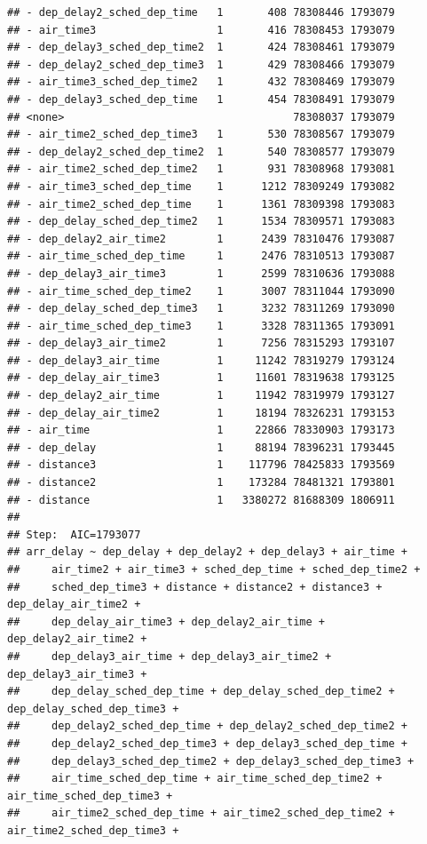 \documentclass[
]{article}
\begin{document}
\begin{verbatim}
## - dep_delay2_sched_dep_time   1       408 78308446 1793079
## - air_time3                   1       416 78308453 1793079
## - dep_delay3_sched_dep_time2  1       424 78308461 1793079
## - dep_delay2_sched_dep_time3  1       429 78308466 1793079
## - air_time3_sched_dep_time2   1       432 78308469 1793079
## - dep_delay3_sched_dep_time   1       454 78308491 1793079
## <none>                                    78308037 1793079
## - air_time2_sched_dep_time3   1       530 78308567 1793079
## - dep_delay2_sched_dep_time2  1       540 78308577 1793079
## - air_time2_sched_dep_time2   1       931 78308968 1793081
## - air_time3_sched_dep_time    1      1212 78309249 1793082
## - air_time2_sched_dep_time    1      1361 78309398 1793083
## - dep_delay_sched_dep_time2   1      1534 78309571 1793083
## - dep_delay2_air_time2        1      2439 78310476 1793087
## - air_time_sched_dep_time     1      2476 78310513 1793087
## - dep_delay3_air_time3        1      2599 78310636 1793088
## - air_time_sched_dep_time2    1      3007 78311044 1793090
## - dep_delay_sched_dep_time3   1      3232 78311269 1793090
## - air_time_sched_dep_time3    1      3328 78311365 1793091
## - dep_delay3_air_time2        1      7256 78315293 1793107
## - dep_delay3_air_time         1     11242 78319279 1793124
## - dep_delay_air_time3         1     11601 78319638 1793125
## - dep_delay2_air_time         1     11942 78319979 1793127
## - dep_delay_air_time2         1     18194 78326231 1793153
## - air_time                    1     22866 78330903 1793173
## - dep_delay                   1     88194 78396231 1793445
## - distance3                   1    117796 78425833 1793569
## - distance2                   1    173284 78481321 1793801
## - distance                    1   3380272 81688309 1806911
## 
## Step:  AIC=1793077
## arr_delay ~ dep_delay + dep_delay2 + dep_delay3 + air_time + 
##     air_time2 + air_time3 + sched_dep_time + sched_dep_time2 + 
##     sched_dep_time3 + distance + distance2 + distance3 + dep_delay_air_time2 + 
##     dep_delay_air_time3 + dep_delay2_air_time + dep_delay2_air_time2 + 
##     dep_delay3_air_time + dep_delay3_air_time2 + dep_delay3_air_time3 + 
##     dep_delay_sched_dep_time + dep_delay_sched_dep_time2 + dep_delay_sched_dep_time3 + 
##     dep_delay2_sched_dep_time + dep_delay2_sched_dep_time2 + 
##     dep_delay2_sched_dep_time3 + dep_delay3_sched_dep_time + 
##     dep_delay3_sched_dep_time2 + dep_delay3_sched_dep_time3 + 
##     air_time_sched_dep_time + air_time_sched_dep_time2 + air_time_sched_dep_time3 + 
##     air_time2_sched_dep_time + air_time2_sched_dep_time2 + air_time2_sched_dep_time3 + 

\end{verbatim}
\end{document}
